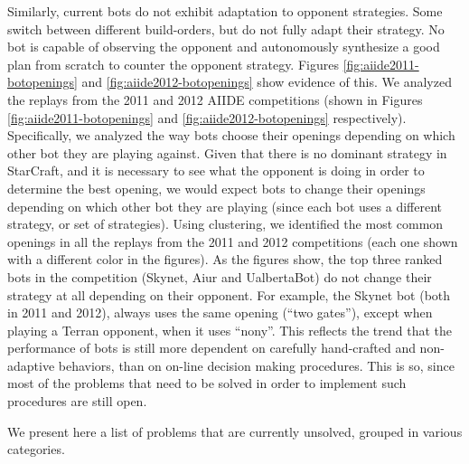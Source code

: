 \documentclass[journal]{IEEEtran}
\begin{document}
Similarly, current bots do not exhibit adaptation to opponent strategies. Some switch between different build-orders, but do not fully adapt their strategy. No bot is capable of observing the opponent and autonomously synthesize a good plan from scratch to counter the opponent strategy. Figures \ref{fig:aiide2011-botopenings} and \ref{fig:aiide2012-botopenings} show evidence of this. We analyzed the replays from the 2011 and 2012 AIIDE competitions (shown in Figures \ref{fig:aiide2011-botopenings} and \ref{fig:aiide2012-botopenings} respectively). Specifically, we analyzed the way bots choose their openings depending on which other bot they are playing against. Given that there is no dominant strategy in StarCraft, and it is necessary to see what the opponent is doing in order to determine the best opening, we would expect bots to change their openings depending on which other bot they are playing (since each bot uses a different strategy, or set of strategies). Using clustering, we identified the most common openings in all the replays from the 2011 and 2012 competitions (each one shown with a different color in the figures). As the figures show, the top three ranked bots in the competition (Skynet, Aiur and UalbertaBot) do not change their strategy at all depending on their opponent. For example, the Skynet bot (both in 2011 and 2012), always uses the same opening (``two gates''), except when playing a Terran opponent, when it uses ``nony''. This reflects the trend that the performance of bots is still more dependent on carefully hand-crafted and non-adaptive behaviors, than on on-line decision making procedures. This is so, since most of the problems that need to be solved in order to implement such procedures are still open.

We present here a list of problems that are currently unsolved, grouped in various categories.
\end{document}
